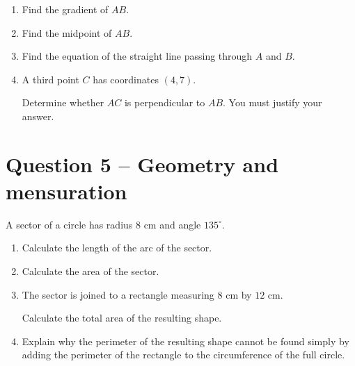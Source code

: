 	\begin{enumerate}
		
		\item[(a)]
		Find the gradient of \(AB\).
		
		\vspace{20mm}
		
		\item[(b)]
		Find the midpoint of \(AB\).
		
		\vspace{20mm}
		
		\item[(c)]
		Find the equation of the straight line passing through \(A\) and \(B\).
		
		\vspace{20mm}
		
		\item[(d)]
		A third point \(C\) has coordinates \((4,7)\).
		
		Determine whether \(AC\) is perpendicular to \(AB\).
		You must justify your answer.
		
	\end{enumerate}
	
	\newpage
	
	\section*{Question 5 -- Geometry and mensuration }
	
	A sector of a circle has radius \(8\) cm and angle \(135^\circ\).
	
	\begin{enumerate}
		
		\item[(a)]
		Calculate the length of the arc of the sector.
		
		\vspace{25mm}
		
		\item[(b)]
		Calculate the area of the sector.
		
		\vspace{25mm}
		
		\item[(c)]
		The sector is joined to a rectangle measuring \(8\) cm by \(12\) cm.
		
		Calculate the total area of the resulting shape.
		
		\vspace{25mm}
		
		\item[(d)]
		Explain why the perimeter of the resulting shape cannot be found simply by adding the perimeter of the rectangle to the circumference of the full circle.
		
	\end{enumerate}
	

